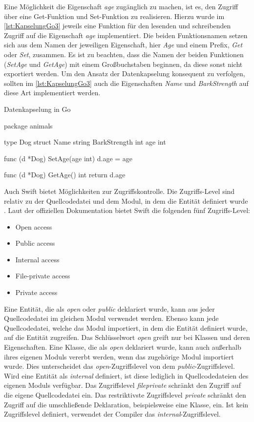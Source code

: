 Eine Möglichkeit die Eigenschaft \emph{age} zugänglich zu machen, ist es, den Zugriff über eine Get-Funktion und Set-Funktion zu realisieren.
Hierzu wurde im \autoref{lst:KapselungGo3} jeweils eine Funktion für den lesenden und schreibenden Zugriff auf die Eigenschaft \emph{age} implementiert. 
Die beiden Funktionsnamen setzen sich aus dem Namen der jeweiligen Eigenschaft, hier \emph{Age} und einem Prefix, \emph{Get} oder \emph{Set}, zusammen.
Es ist zu beachten, dass die Namen der beiden Funktionen (\emph{SetAge} und \emph{GetAge}) mit einem Großbuchstaben beginnen, da diese sonst nicht exportiert werden. 
Um den Ansatz der Datenkapselung konsequent zu verfolgen, sollten im \autoref{lst:KapselungGo3} auch die Eigenschaften \emph{Name} und \emph{BarkStrength} auf diese Art implementiert werden.   

\begin{listing}[H]
\caption{Datenkapselung in Go}
\label{lst:KapselungGo3}
\begin{GoCode}
package animals

type Dog struct {
    Name string
    BarkStrength int
    age int
}

func (d *Dog) SetAge(age int) {
    d.age = age
}

func (d *Dog) GetAge() int {
    return d.age
}
\end{GoCode}
\end{listing}

Auch Swift bietet Möglichkeiten zur Zugriffskontrolle. 
Die Zugriffs-Level sind relativ zu der Quellcodedatei und dem Modul, in dem die Entität definiert wurde \cite[S.394]{Apple.2017}.
Laut der offiziellen Dokumentation \cite[S.394]{Apple.2017} bietet Swift die folgenden fünf Zugriffs-Level:

\begin{itemize}
    \item Open access
    \item Public access
    \item Internal access
    \item File-private access
    \item Private access
\end{itemize}

Eine Entität, die als \textit{open} oder \textit{public} deklariert wurde, kann aus jeder Quellcodedatei im gleichen Modul verwendet werden. 
Ebenso kann jede Quellcodedatei, welche das Modul importiert, in dem die Entität definiert wurde, auf die Entität zugreifen. 
Das Schlüsselwort \textit{open} greift nur bei Klassen und deren Eigenschaften.
Eine Klasse, die als \textit{open} deklariert wurde, kann auch außerhalb ihres eigenen Moduls vererbt werden, wenn das zugehörige Modul importiert wurde.
Dies unterscheidet das \textit{open}-Zugriffslevel von dem \textit{public}-Zugriffslevel.
Wird eine Entität als \textit{internal} definiert, ist diese lediglich in Quellcodedateien des eigenen Moduls verfügbar. 
Das Zugriffslevel \textit{fileprivate} schränkt den Zugriff auf die eigene Quellcodedatei ein.
Das restriktivste Zugriffslevel \textit{private} schränkt den Zugriff auf die umschließende Deklaration, beispielsweise eine Klasse, ein.
Ist kein Zugriffslevel definiert, verwendet der Compiler das \textit{internal}-Zugriffslevel.


